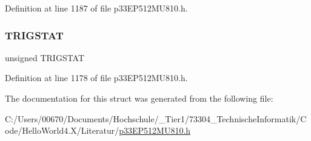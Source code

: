Definition at line 1187 of file p33\+E\+P512\+M\+U810.\+h.

\mbox{\label{structtag_i_c12_c_o_n2_b_i_t_s_ab379549de54ac93ad4aa73686c34cb7c}} 
\subsubsection{\texorpdfstring{T\+R\+I\+G\+S\+T\+AT}{TRIGSTAT}}
{\footnotesize\ttfamily unsigned T\+R\+I\+G\+S\+T\+AT}



Definition at line 1178 of file p33\+E\+P512\+M\+U810.\+h.



The documentation for this struct was generated from the following file\+:\begin{DoxyCompactItemize}
\item 
C\+:/\+Users/00670/\+Documents/\+Hochschule/\+\_\+\+Tier1/73304\+\_\+\+Technische\+Informatik/\+Code/\+Hello\+World4.\+X/\+Literatur/\hyperlink{p33_e_p512_m_u810_8h}{p33\+E\+P512\+M\+U810.\+h}\end{DoxyCompactItemize}
